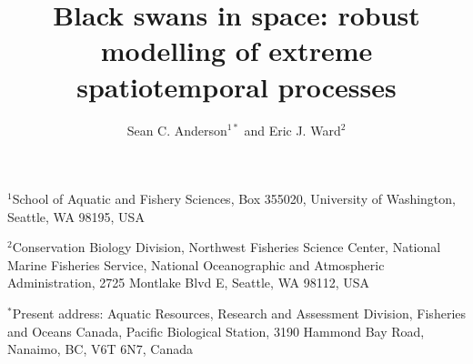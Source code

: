 \documentclass[12pt,english]{article}
\title{
  Black swans in space:
  robust modelling of extreme spatiotemporal processes}
\author{
Sean C. Anderson$^{1\ast}$ and
Eric J. Ward$^2$
}
\date{}
\begin{document}
\maketitle

$^1$School of Aquatic and Fishery Sciences, Box 355020, University of
Washington, Seattle, WA 98195, USA

$^2$Conservation Biology Division, Northwest Fisheries Science Center, National
Marine Fisheries Service, National Oceanographic and Atmospheric Administration,
2725 Montlake Blvd E, Seattle, WA 98112, USA

$^{\ast}$Present address:
Aquatic Resources, Research and Assessment Division,
Fisheries and Oceans Canada,
Pacific Biological Station,
3190 Hammond Bay Road,
Nanaimo, BC, V6T 6N7, Canada

\RaggedRight
{}
\end{document}
